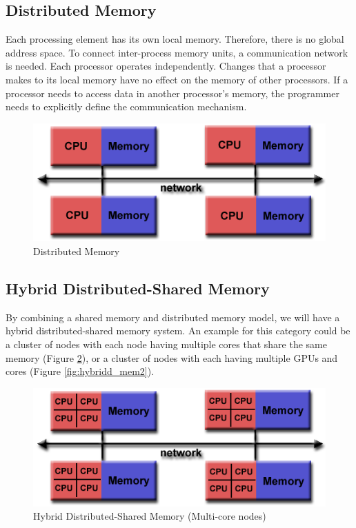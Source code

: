 \subsection{Distributed Memory}
Each processing element has its own local memory. Therefore, there is no global address space. To connect inter-process memory units, a communication network is needed.
Each processor operates independently. Changes that a processor makes to its local memory have no effect on the memory of other processors. If a processor needs to access data in another processor's memory, the programmer needs to explicitly define the communication mechanism.

\begin{figure}[h!]
  \centering
  \includegraphics[scale=0.6]{images/distributed_mem.png}
  \caption{Distributed Memory}
  \label{fig:distributed_mem}
\end{figure}


\subsection{Hybrid Distributed-Shared Memory}
By combining a shared memory and distributed memory model, we will have a hybrid distributed-shared memory system. An example for this category could be a cluster of nodes with each node having multiple cores that share the same memory (Figure \ref{fig:hybridd_mem}), or a cluster of nodes with each having multiple GPUs and cores (Figure \ref{fig:hybridd_mem2}).

\begin{figure}[ht]
  \centering
  \includegraphics[scale=0.6]{images/hybrid_mem.png}
  \caption{Hybrid Distributed-Shared Memory (Multi-core nodes)}
  \label{fig:hybridd_mem}
\end{figure}


